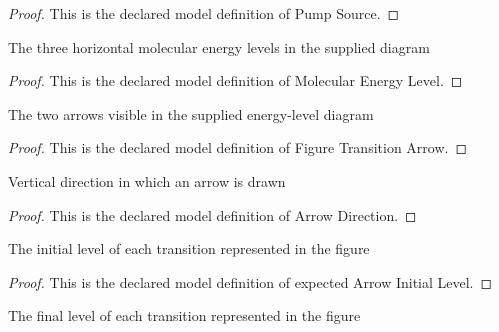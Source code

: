 \begin{proof}
  This is the declared model definition of Pump Source.
\end{proof}
\begin{definition}
  \label{def:physics:phyx-mini-0579:phyxminiproblems-problemphyxmini0579-molecularenergylevel}
  The three horizontal molecular energy levels in the supplied diagram
\end{definition}
\begin{proof}
  This is the declared model definition of Molecular Energy Level.
\end{proof}
\begin{definition}
  \label{def:physics:phyx-mini-0579:phyxminiproblems-problemphyxmini0579-figuretransitionarrow}
  The two arrows visible in the supplied energy-level diagram
\end{definition}
\begin{proof}
  This is the declared model definition of Figure Transition Arrow.
\end{proof}
\begin{definition}
  \label{def:physics:phyx-mini-0579:phyxminiproblems-problemphyxmini0579-arrowdirection}
  Vertical direction in which an arrow is drawn
\end{definition}
\begin{proof}
  This is the declared model definition of Arrow Direction.
\end{proof}
\begin{definition}
  \label{def:physics:phyx-mini-0579:phyxminiproblems-problemphyxmini0579-expectedarrowinitiallevel}
  The initial level of each transition represented in the figure
\end{definition}
\begin{proof}
  This is the declared model definition of expected Arrow Initial Level.
\end{proof}
\begin{definition}
  \label{def:physics:phyx-mini-0579:phyxminiproblems-problemphyxmini0579-expectedarrowfinallevel}
  The final level of each transition represented in the figure
\end{definition}

